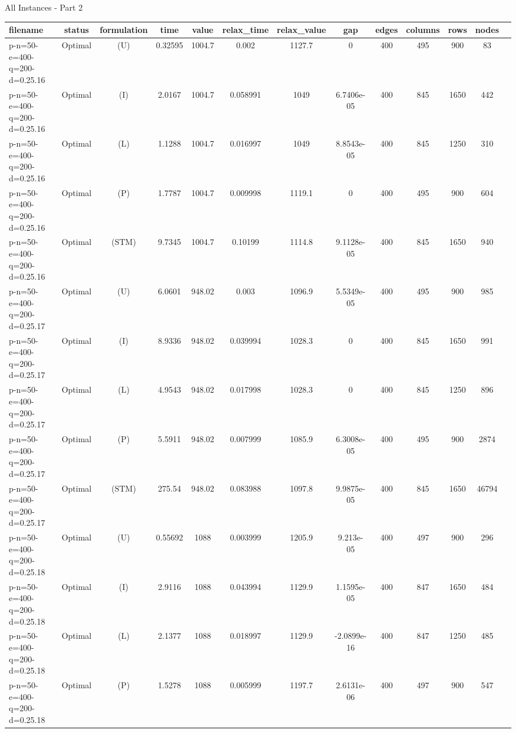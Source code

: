 \documentclass[landscape, a4paper]{article}
\newcommand{\STM}{\ensuremath{\mathrm{STM}}}
\newcommand{\Improved}{\ensuremath{\mathrm{I}}}
\newcommand{\Loose}{\ensuremath{\mathrm{L}}}
\newcommand{\Profit}{\ensuremath{\mathrm{P}}}
\newcommand{\Utility}{\ensuremath{\mathrm{U}}}
\begin{document}
\begin{center}
All Instances - Part 2

\begin{tabular}{lcccccccccccc}
filename & status & formulation & time & value & relax\_time & relax\_value & gap & edges & columns & rows & nodes & \\
\hline
p-n=50-e=400-q=200-d=0.25.16 & Optimal & (\Utility) & 0.32595 & 1004.7 & 0.002 & 1127.7 & 0 & 400 & 495 & 900 & 83 & \\
p-n=50-e=400-q=200-d=0.25.16 & Optimal & (\Improved) & 2.0167 & 1004.7 & 0.058991 & 1049 & 6.7406e-05 & 400 & 845 & 1650 & 442 & \\
p-n=50-e=400-q=200-d=0.25.16 & Optimal & (\Loose) & 1.1288 & 1004.7 & 0.016997 & 1049 & 8.8543e-05 & 400 & 845 & 1250 & 310 & \\
p-n=50-e=400-q=200-d=0.25.16 & Optimal & (\Profit) & 1.7787 & 1004.7 & 0.009998 & 1119.1 & 0 & 400 & 495 & 900 & 604 & \\
p-n=50-e=400-q=200-d=0.25.16 & Optimal & (\STM) & 9.7345 & 1004.7 & 0.10199 & 1114.8 & 9.1128e-05 & 400 & 845 & 1650 & 940 & \\
p-n=50-e=400-q=200-d=0.25.17 & Optimal & (\Utility) & 6.0601 & 948.02 & 0.003 & 1096.9 & 5.5349e-05 & 400 & 495 & 900 & 985 & \\
p-n=50-e=400-q=200-d=0.25.17 & Optimal & (\Improved) & 8.9336 & 948.02 & 0.039994 & 1028.3 & 0 & 400 & 845 & 1650 & 991 & \\
p-n=50-e=400-q=200-d=0.25.17 & Optimal & (\Loose) & 4.9543 & 948.02 & 0.017998 & 1028.3 & 0 & 400 & 845 & 1250 & 896 & \\
p-n=50-e=400-q=200-d=0.25.17 & Optimal & (\Profit) & 5.5911 & 948.02 & 0.007999 & 1085.9 & 6.3008e-05 & 400 & 495 & 900 & 2874 & \\
p-n=50-e=400-q=200-d=0.25.17 & Optimal & (\STM) & 275.54 & 948.02 & 0.083988 & 1097.8 & 9.9875e-05 & 400 & 845 & 1650 & 46794 & \\
p-n=50-e=400-q=200-d=0.25.18 & Optimal & (\Utility) & 0.55692 & 1088 & 0.003999 & 1205.9 & 9.213e-05 & 400 & 497 & 900 & 296 & \\
p-n=50-e=400-q=200-d=0.25.18 & Optimal & (\Improved) & 2.9116 & 1088 & 0.043994 & 1129.9 & 1.1595e-05 & 400 & 847 & 1650 & 484 & \\
p-n=50-e=400-q=200-d=0.25.18 & Optimal & (\Loose) & 2.1377 & 1088 & 0.018997 & 1129.9 & -2.0899e-16 & 400 & 847 & 1250 & 485 & \\
p-n=50-e=400-q=200-d=0.25.18 & Optimal & (\Profit) & 1.5278 & 1088 & 0.005999 & 1197.7 & 2.6131e-06 & 400 & 497 & 900 & 547 & \\

\end{tabular}
\end{center}
\end{document}
